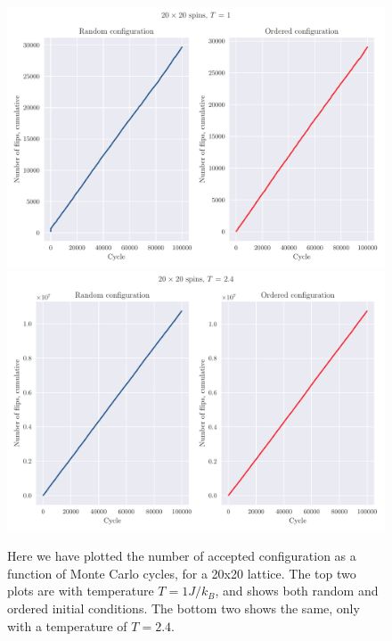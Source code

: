 \documentclass[reprint, english,notitlepage,nofootinbib]{revtex4-1}  %
\begin{document}
\begin{figure}[!htb]
	\includegraphics[width=16cm]{../output/de/L20-T1-dT0_0-NT1-N5-NumFlips.pdf}
	\includegraphics[width=16cm]{../output/de/L20-T2_4-dT0_0-NT1-N5-NumFlips.pdf}
	\caption{Here we have plotted the number of accepted configuration as a function of Monte Carlo cycles, for a 20x20 lattice. The top two plots are with temperature $T=1J/k_B$, and shows both random and ordered initial conditions. The bottom two shows the same, only with a temperature of $T = 2.4$.}
	\label{fig:Num_flips_T1_and_T2_4}
\end{figure}
\end{document}
